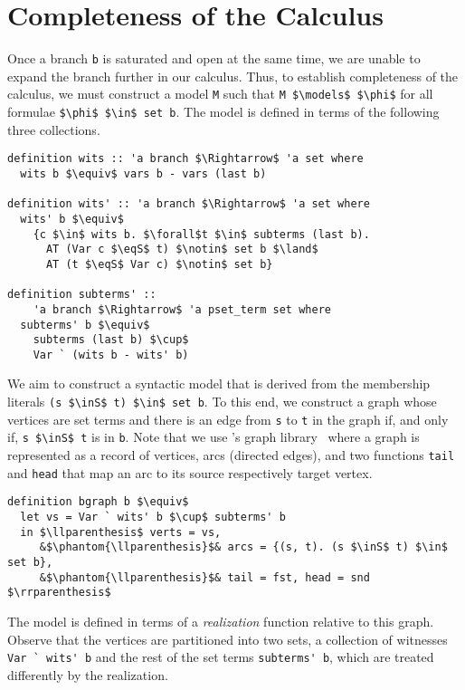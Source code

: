 \documentclass[sigplan,10pt,anonymous,review]{acmart}
\newcommand{\inS}{\in_\text{s}}
\newcommand{\eqS}{=_\text{s}}
\begin{document}
\section{Completeness of the Calculus\label{sec:complete}}
Once a branch \lstinline!b! is saturated and open at the same time, we are unable to expand the branch further in our calculus.
Thus, to establish completeness of the calculus, we must construct a model \lstinline!M! such that \lstinline!M $\models$ $\phi$! for all formulae \lstinline!$\phi$ $\in$ set b!.
The model is defined in terms of the following three collections.
\begin{lstlisting}
definition wits :: 'a branch $\Rightarrow$ 'a set where
  wits b $\equiv$ vars b - vars (last b)

definition wits' :: 'a branch $\Rightarrow$ 'a set where
  wits' b $\equiv$
    {c $\in$ wits b. $\forall$t $\in$ subterms (last b).
      AT (Var c $\eqS$ t) $\notin$ set b $\land$
      AT (t $\eqS$ Var c) $\notin$ set b} 

definition subterms' ::
    'a branch $\Rightarrow$ 'a pset_term set where
  subterms' b $\equiv$
    subterms (last b) $\cup$ 
    Var ` (wits b - wits' b)
\end{lstlisting}
We aim to construct a syntactic model that is derived from the membership literals \lstinline!(s $\inS$ t) $\in$ set b!.
To this end, we construct a graph whose vertices are set terms and there is an edge from \lstinline!s! to \lstinline!t! in the graph if, and only if, \lstinline!s $\inS$ t! is in \lstinline!b!.
Note that we use \citeauthor{graph_theory_afp}'s graph library~\cite{graph_theory_afp} where a graph is represented as a record of vertices, arcs (directed edges), and two functions \lstinline!tail! and \lstinline!head! that map an arc to its source respectively target vertex.
\begin{lstlisting}
definition bgraph b $\equiv$
  let vs = Var ` wits' b $\cup$ subterms' b
  in $\llparenthesis$ verts = vs,
     &$\phantom{\llparenthesis}$& arcs = {(s, t). (s $\inS$ t) $\in$ set b},
     &$\phantom{\llparenthesis}$& tail = fst, head = snd $\rrparenthesis$
\end{lstlisting}
The model is defined in terms of a \textit{realization} function relative to this graph.
Observe that the vertices are partitioned into two sets, a collection of witnesses \lstinline!Var ` wits' b! and the rest of the set terms \lstinline!subterms' b!, which are treated differently by the realization.
\end{document}
